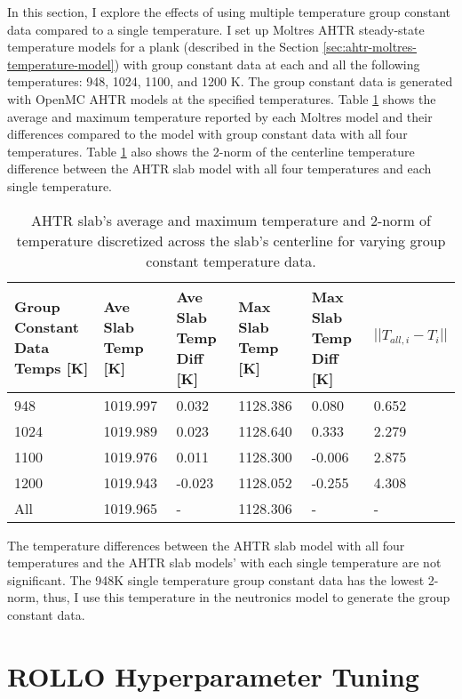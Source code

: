 In this section, I explore the effects of using multiple temperature group 
constant data compared to a single temperature.
I set up Moltres AHTR steady-state temperature models for a plank (described in the 
Section \ref{sec:ahtr-moltres-temperature-model}) with group constant data at each and 
all the following temperatures: 948, 1024, 1100, and 1200 K. 
The group constant data is generated with OpenMC \gls{AHTR} models at the specified 
temperatures. 
Table \ref{tab:moltres-group-constant-temps} shows the average and maximum temperature 
reported by each Moltres model and their differences compared to the model with 
group constant data with all four temperatures. 
Table \ref{tab:moltres-group-constant-temps} also shows the 2-norm of the 
centerline temperature difference between the AHTR slab model with all four temperatures 
and each single temperature. 
\begin{table}[]
    \centering
    \onehalfspacing
    \caption{AHTR slab's average and maximum temperature and 2-norm of temperature 
    discretized across the slab's centerline for varying group constant temperature data.}
	\label{tab:moltres-group-constant-temps}
    \scriptsize
    \begin{tabular}{p{2.5cm}p{2cm}p{2.4cm}p{2cm}p{2.4cm}p{2cm}}
    \hline 
    \textbf{Group Constant Data Temps [K]}& \textbf{Ave Slab Temp [K]}& 
    \textbf{Ave Slab Temp Diff [K]}& \textbf{Max Slab Temp [K]} & 
    \textbf{Max Slab Temp Diff [K]} & $||T_{all, i} - T_{i}||$ \\ 
    \hline 
     948 & 1019.997 &  0.032 & 1128.386 &  0.080 & 0.652\\
    1024 & 1019.989 &  0.023 & 1128.640 &  0.333 & 2.279 \\
    1100 & 1019.976 &  0.011 & 1128.300 & -0.006 & 2.875 \\
    1200 & 1019.943 & -0.023 & 1128.052 & -0.255 & 4.308 \\
    All  & 1019.965 &  -     & 1128.306 & -      & -    \\
    \hline
    \end{tabular}
\end{table}
The temperature differences between the AHTR slab model with all four temperatures 
and the AHTR slab models' with each single temperature are not significant. 
The 948K single temperature group constant data has the lowest 2-norm, thus, I 
use this temperature in the neutronics model to generate the group constant data. 

\section{ROLLO Hyperparameter Tuning}
